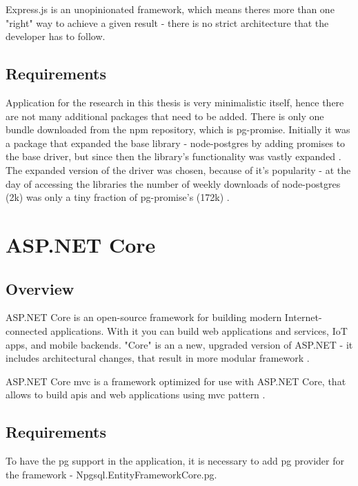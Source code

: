 Express.js is an unopinionated framework, which means theres more than one "right" way to achieve a given result - there is no strict architecture that the developer has to follow.

\subsection{Requirements}
Application for the research in this thesis is very minimalistic itself, hence there are not many additional packages that need to be added. There is only one bundle downloaded from the \acrshort{npm} repository, which is pg-promise. Initially it was a package that expanded the base library - node-postgres by adding promises to the base driver, but since then the library's functionality was vastly expanded \cite{pgPromiseGit}. 
The expanded version of the driver was chosen, because of it's popularity - at the day of accessing the libraries the number of weekly downloads of node-postgres (2k) \cite{nodePostgresNpm} was only a tiny fraction of pg-promise's (172k) \cite{pgPromiseNpm}.


\section{ASP.NET Core}

\subsection{Overview}
ASP.NET Core is an open-source framework for building modern Internet-connected applications. With it you can build web applications and services, IoT apps, and mobile backends. "Core" is an a new, upgraded version of ASP.NET - it includes architectural changes, that result in more modular framework \cite{aspnetIntroduction}.

ASP.NET Core \acrshort{mvc} is a framework optimized for use with ASP.NET Core, that allows to build \acrshort{api}s and web applications using \acrlong{mvc} pattern \cite{aspnetMvcOverview}.

\subsection{Requirements}

To have the \acrlong{pg} support in the application, it is necessary to add \acrshort{pg} provider for the framework - Npgsql.EntityFrameworkCore.\acrlong{pg}.


